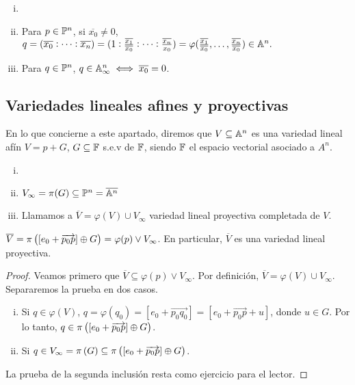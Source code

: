 \begin{obs}
  \begin{enumerate}[i)]
    \item[]
    \item Para $p \in \mathbb{P}^n$, si $\overline{x_0} \neq 0$, $q = (\overline{x_0}:
      \dots:\overline{x_n}) = (1:\frac{\overline{x_1}}{\overline{x_0}}:
      \dots:\frac{\overline{x_n}}{x_0}) = \varphi(\frac{\overline{x_1}}{\overline{x_0}}
      ,\dots,\frac{\overline{x_n}}{\overline{x_0}}) \in \mathbb{A}^n.$
    \item Para $q \in \mathbb{P}^n$, $q \in \mathbb{A}^n_\infty \iff \overline{x_0} = 0$.
  \end{enumerate}
\end{obs}

\subsection{Variedades lineales afines y proyectivas}

En lo que concierne a este apartado, diremos que $V \subseteq \mathbb{A}^n$ es una variedad 
lineal afín $V = p+G$, $G \subseteq \mathbb{F}$ s.e.v de $\mathbb{F}$, siendo $\mathbb{F}$ el espacio vectorial
asociado a $A^n$.

\begin{defi}
  \begin{enumerate}[i)]
    \item[]
    \item $V_\infty = \pi(G) \subseteq \mathbb{P}^n = \overline{\mathbb{A}^n}$
    \item Llamamos a $\overline{V} = \varphi(V) \cup V_\infty$ variedad lineal 
      proyectiva completada de $V$.
  \end{enumerate}
\end{defi}

\begin{prop}
  $\overline{V} = \pi \left( [e_0 + \overrightarrow{p_0p}] \oplus G \right) = \varphi(p) \vee
  V_\infty$. En particular, $\overline{V}$ es una variedad lineal proyectiva. 
\end{prop}

\begin{proof}
  Veamos primero que $\overline{V} \subseteq \varphi(p) \vee V_\infty$. Por definición,
  $\overline{V} = \varphi(V) \cup V_\infty$. Separaremos la prueba en dos casos.
  \begin{enumerate}[i)]
    \item Si $q \in \varphi(V)$, $q = \varphi(q_0) = [e_0 + \overrightarrow{p_0q_0}]
        = [e_0 + \overrightarrow{p_0p}+u]$, donde $u \in G$. Por lo tanto,
        $q \in \pi \left([e_0 + \overrightarrow{p_0p}] \oplus G \right)$.
      \item Si $q \in V_\infty = \pi \left( G \right) \subseteq \pi \left( [e_0 + \overrightarrow{p_0
        p}] \oplus G \right)$.
  \end{enumerate}
  
  La prueba de la segunda inclusión resta como ejercicio para el lector.
\end{proof}


